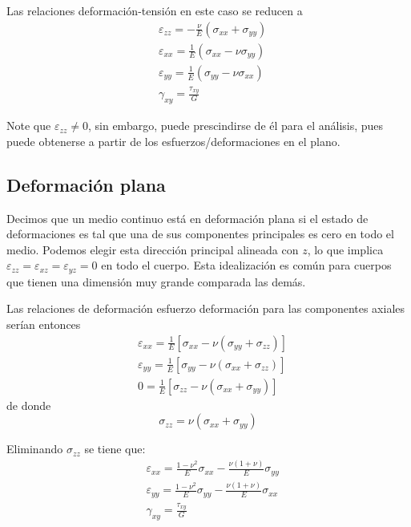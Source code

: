 \documentclass[../notas medios.tex]{subfiles}
\begin{document}
Las relaciones deformación-tensión en este caso se reducen a
\begin{equation} \label{platension}
\begin{split}
& \varepsilon_{zz} =  - \frac{\nu }{E}(\sigma_{xx} + \sigma_{yy}) \\
& \varepsilon_{xx} =    \frac{1}{E}(\sigma_{xx} - \nu \sigma_{yy})\\
& \varepsilon_{yy} = \frac{1}{E}(\sigma_{yy} - \nu \sigma_{xx})\\
& \gamma_{xy} = \frac{\tau_{xy}}{G}
\end{split}
\end{equation}

Note que \(\varepsilon_{zz} \neq 0\), sin embargo, puede prescindirse de él para el análisis, pues puede obtenerse a partir de los esfuerzos/deformaciones en el plano.


\subsection{Deformación plana}
Decimos que un medio continuo está en deformación plana si el estado de deformaciones es tal que una de sus componentes principales es cero en todo el medio. Podemos elegir esta dirección principal alineada con \(z\), lo que implica \(\varepsilon_{zz}=\varepsilon_{xz}=\varepsilon_{yz}=0\) en todo el cuerpo. Esta idealización es común para cuerpos que tienen una dimensión muy grande comparada las demás.

Las relaciones de deformación esfuerzo deformación para las componentes axiales serían entonces
\begin{align*}
&\varepsilon_{xx} = \frac{1}{E}\left[\sigma_{xx} - \nu (\sigma_{yy} + \sigma_{zz}) \right]\\
&\varepsilon_{yy} = \frac{1}{E}\left[\sigma_{yy} - \nu (\sigma_{xx} + \sigma_{zz}) \right]\\
&0 = \frac{1}{E}\left[\sigma_{zz} - \nu (\sigma_{xx} + \sigma_{yy}) \right]
\end{align*}
de donde
\[\sigma_{zz} = \nu (\sigma_{xx} + \sigma_{yy})\]

Eliminando $\sigma _{zz}$ se tiene que:
\begin{equation} \label{plastrain}
\begin{split}
& {\varepsilon _{xx}} = \frac{{1 - {\nu ^2}}}{E}{\sigma _{xx}} - \frac{{\nu (1 + \nu )}}{E}{\sigma _{yy}} \\
& {\varepsilon _{yy}} = \frac{{1 - {\nu ^2}}}{E}{\sigma _{yy}} - \frac{{\nu (1 + \nu )}}{E}{\sigma _{xx}} \\
& {\gamma _{xy}} = \frac{{{\tau _{xy}}}}{G}
\end{split}
\end{equation}
\end{document}
